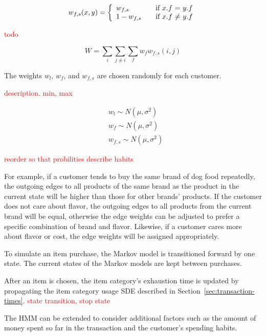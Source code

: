 \documentclass[conference]{IEEEtran}
\begin{document}
\begin{equation*}
w_{f,s}(x,y) = \left\{ 
  \begin{array}{l l}
   w_{f,s}  & \quad \text{if $x$.$f$ = $y$.$f$}\\
   1 - w_{f, s} & \quad \text{if $x$.$f$ $\neq$ $y$.$f$}
  \end{array} \right.
\end{equation*} 

\textcolor{red}{todo}

\begin{equation*}
W = \sum_i \sum_{j \neq i} \sum_f w_f w_{f,s}(i, j)
\end{equation*}

The weights $w_l$, $w_f$, and $w_{f, s}$ are chosen randomly for each customer.  

\textcolor{red}{description. min, max}

\begin{align} \label{eq:item-weights}
&w_l \sim N(\mu, \sigma^2) \nonumber \\
&w_f \sim N(\mu, \sigma^2) \nonumber \\
&w_{f, s} \sim N(\mu, \sigma^2)
\end{align}


\textcolor{red}{reorder so that probilities describe habits}

For example, if a customer tends to buy the same brand of dog food repeatedly, the outgoing edges to all products of the same brand as the product in the current state will be higher than those for other brands' products. If the customer does not care about flavor, the outgoing edges to all products from the current brand will be equal, otherwise the edge weights can be adjusted to prefer a specific combination of brand and flavor.  Likewise, if a customer cares more about flavor or cost, the edge weights will be assigned appropriately.

To simulate an item purchase, the Markov model is transitioned forward by one state.  The current states of the Markov models are kept between purchases.


After an item is chosen, the item category's exhaustion time is updated by propagating the item category usage SDE described in Section~\ref{sec:transaction-times}. \textcolor{red}{state transition, stop state}

The HMM can be extended to consider additional factors such as the amount of money spent so far in the transaction and the customer's spending habits.
\end{document}
